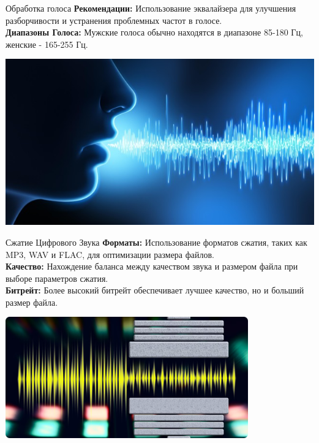 \documentclass{beamer}
\begin{document}
\begin{frame}{Обработка голоса}
    \textbf{Рекомендации: } Использование эквалайзера для улучшения разборчивости и устранения проблемных частот в голосе. \\
    \vspace{0.3cm}
    \textbf{Диапазоны Голоса: } Мужские голоса обычно находятся в диапазоне 85-180 Гц, женские - 165-255 Гц. \\
    \begin{center}
        \includegraphics[width=0.6\linewidth]{pic5.jpg} %
    \end{center}
\end{frame}

\begin{frame}{Сжатие Цифрового Звука}
	\textbf{Форматы: } Использование форматов сжатия, таких как MP3, WAV и FLAC, для оптимизации размера файлов. \\
	\vspace{0.3cm}
	\textbf{Качество: } Нахождение баланса между качеством звука и размером файла при выборе параметров сжатия. \\
	\vspace{0.3cm}
	\textbf{Битрейт: } Более высокий битрейт обеспечивает лучшее качество, но и больший размер файла.
	\begin{center}
		\includegraphics[width=0.6\linewidth]{pic6.png} %
	\end{center}
\end{frame}
\end{document}
